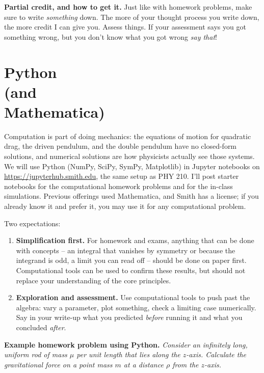 \medskip
\textbf{Partial credit, and how to get it.} Just like with homework problems,
make sure to write \emph{something} down. The more of your thought process you
write down, the more credit I can give you. Assess things. If your assessment
says you got something wrong, but you don't know what you got wrong \emph{say that}!

\bigskip


\section{Python \\ (and \\ Mathematica)}
%
Computation is part of doing mechanics: the equations of motion for
quadratic drag, the driven pendulum, and the double pendulum have no
closed-form solutions, and numerical solutions are how physicists
actually see those systems. We will use Python (NumPy, SciPy, SymPy,
Matplotlib) in Jupyter notebooks on \url{https://jupyterhub.smith.edu}, the
same setup as PHY 210. I'll post starter notebooks for the computational
homework problems and for the in-class simulations. Previous offerings
used Mathematica, and Smith has a license; if you already know it and
prefer it, you may use it for any computational problem.

\medskip
Two expectations:
\begin{enumerate}
  \item \textbf{Simplification first.} For homework and exams, anything
    that can be done with concepts -- an integral that vanishes by
    symmetry or because the integrand is odd, a limit you can read off --
    should be done on paper first. Computational tools can be used to confirm
    these results, but should not replace your understanding of the core principles.
  \item \textbf{Exploration and assessment.} Use computational tools to push
    past the algebra: vary a parameter, plot something, check a limiting
    case numerically. Say in your write-up what you predicted
    \emph{before} running it and what you concluded \emph{after}.
\end{enumerate}

\medskip
\textbf{Example homework problem using Python.} \emph{Consider an infinitely long, uniform rod of mass
$\mu$ per unit length that lies along the $z$-axis. Calculate the
gravitational force on a point mass $m$ at a distance $\rho$ from the
$z$-axis.}

